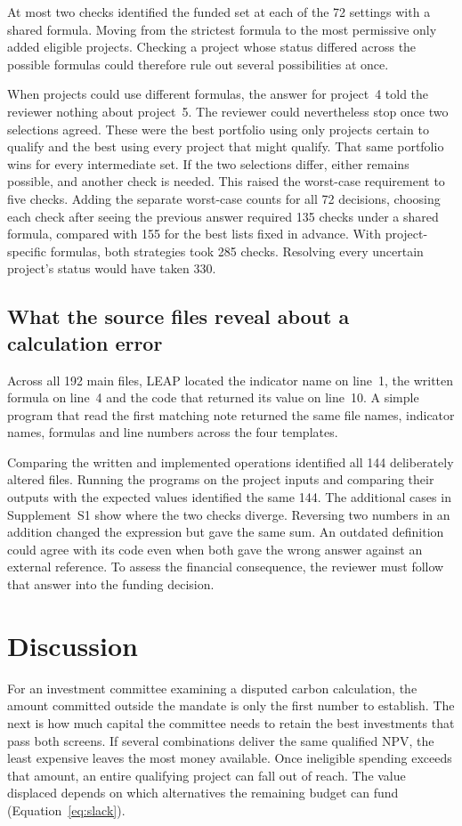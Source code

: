 \documentclass[ijfs,article,submit,oneauthor]{Definitions/mdpi}
\begin{document}
At most two checks identified the funded set at each of the 72 settings with a shared formula. Moving from the strictest formula to the most permissive only added eligible projects. Checking a project whose status differed across the possible formulas could therefore rule out several possibilities at once.

When projects could use different formulas, the answer for project~4 told the reviewer nothing about project~5. The reviewer could nevertheless stop once two selections agreed. These were the best portfolio using only projects certain to qualify and the best using every project that might qualify. That same portfolio wins for every intermediate set. If the two selections differ, either remains possible, and another check is needed. This raised the worst-case requirement to five checks. Adding the separate worst-case counts for all 72 decisions, choosing each check after seeing the previous answer required 135 checks under a shared formula, compared with 155 for the best lists fixed in advance. With project-specific formulas, both strategies took 285 checks. Resolving every uncertain project's status would have taken 330.

\subsection{What the source files reveal about a calculation error}
Across all 192 main files, LEAP located the indicator name on line~1, the written formula on line~4 and the code that returned its value on line~10. A simple program that read the first matching note returned the same file names, indicator names, formulas and line numbers across the four templates.

Comparing the written and implemented operations identified all 144 deliberately altered files. Running the programs on the project inputs and comparing their outputs with the expected values identified the same 144. The additional cases in Supplement~S1 show where the two checks diverge. Reversing two numbers in an addition changed the expression but gave the same sum. An outdated definition could agree with its code even when both gave the wrong answer against an external reference. To assess the financial consequence, the reviewer must follow that answer into the funding decision.

\section{Discussion}
For an investment committee examining a disputed carbon calculation, the amount committed outside the mandate is only the first number to establish. The next is how much capital the committee needs to retain the best investments that pass both screens. If several combinations deliver the same qualified NPV, the least expensive leaves the most money available. Once ineligible spending exceeds that amount, an entire qualifying project can fall out of reach. The value displaced depends on which alternatives the remaining budget can fund (Equation~\eqref{eq:slack}).
\end{document}
